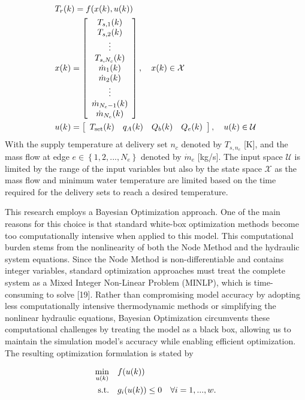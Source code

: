 \begin{align}
& T_r(k) = f(x(k), u(k)) \notag \\
& x(k) = 
\left[\begin{array}{c}
T_{s,1}(k) \\
T_{s,2}(k) \\
 \vdots  \\
T_{s,N_c}(k) \\
\dot{m}_1(k)  \\
\dot{m}_2(k) \\
\vdots \\
\dot{m}_{N_e - 1}(k) \\
\dot{m}_{N_e}(k)  \\
\end{array}\right], \quad x(k) \in \mathcal{X}\\
&u(k) =  \left[\begin{array}{cccc}
T_{\text{set}}(k) & q_A(k) & Q_b(k) & Q_e(k) 
\end{array}\right], \quad u(k) \in \mathcal{U} \notag 
\end{align}
With the supply temperature at delivery set $n_c$ denoted by $T_{s,n_c}$ [K], and the mass flow at edge $e \in \left\{1,2,...,N_e \right\}$ denoted by $\dot{m}_{e}$ [kg/s]. The input space $\mathcal{U}$ is limited by the range of the input variables but also by the state space $\mathcal{X}$ as the mass flow and minimum water temperature are limited based on the time required for the delivery sets to reach a desired temperature. 

This research employs a Bayesian Optimization approach. One of the main reasons for this choice is that standard white-box optimization methods become too computationally intensive when applied to this model. This computational burden stems from the nonlinearity of both the Node Method and the hydraulic system equations. Since the Node Method is non-differentiable and contains integer variables, standard optimization approaches must treat the complete system as a Mixed Integer Non-Linear Problem (MINLP), which is time-consuming to solve [19]. Rather than compromising model accuracy by adopting less computationally intensive thermodynamic methods or simplifying the nonlinear hydraulic equations, Bayesian Optimization circumvents these computational challenges by treating the model as a black box, allowing us to maintain the simulation model's accuracy while enabling efficient optimization. The resulting optimization formulation is stated by 

\begin{align}
\min_{u(k)} & \quad f(u(k)) \\
\text{s.t.} & \quad g_i(u(k)) \leq 0 \quad \forall i =1 ,...,w. \notag \\
\notag
\end{align}
